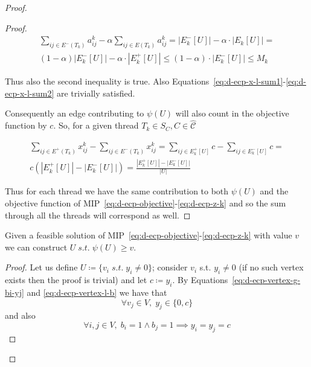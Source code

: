 \begin{proof}
\begin{proof}
		\begin{multline}
			\sum^{}_{ij \in E^{-} (T_k)} a_{ij}^{k}  - \alpha \sum^{}_{ij \in E(T_k)}
			a_{ij} ^{k} = |E^{-}_{k}[U]| - \alpha \cdot |E_{k}[U]| = \\
			(1- \alpha)|E^{-}_{k}[U]| - \alpha \cdot |E^{+}_{k}[U]| \leq
			(1 -\alpha) \cdot |E^{-}_{k}[U]| \leq M_k
		\end{multline}

		Thus also the second inequality is true. Also
		Equations~\ref{eq:d-ecp-x-l-sum1}-\ref{eq:d-ecp-x-l-sum2} are trivially
		satisfied.

		\bigskip
		Consequently an edge contributing to $\psi(U)$ will also count in the
		objective function by $c$. So, for a given thread $T_k \in S_C, C \in \mathcal{\hat{C}}$

		\begin{multline*}
			\sum^{}_{ij \in E^{+} (T_{k})} x_{ij} ^{k} - \sum_{ij \in E^{-}
				(T_{k})} x_{ij} ^{k} = \sum^{}_{ij \in E^{+}_k[U] } c - \sum_{ij \in E^{-}
			_k[U]} c = \\ c (|E^{+}_{k}[U]| - |E^{-}_{k}[U]|) =
			\frac{|E^{+}_{k}[U]| - |E^{-}_{k}[U]|}{|U|}
		\end{multline*}

		Thus for each thread we have the same contribution to both $\psi(U)$
		and the objective function of
		MIP~\ref{eq:d-ecp-objective}-\ref{eq:d-ecp-z-k} and so the sum through
		all the threads will correspond as well.
	\end{proof}

	\begin{claim}
		Given a feasible solution of
		MIP~\ref{eq:d-ecp-objective}-\ref{eq:d-ecp-z-k} with value $v$ we can
		construct $U \; s.t. \; \psi(U) \geq v$.
	\end{claim}

	\begin{proof}

		Let us define $U \coloneqq \{ v_i \; s.t. \; y_i \neq 0\}$; consider
		$v_i$ s.t. $y_i \neq 0$ (if no such vertex exists then the proof is
		trivial) and let $c \coloneqq y_i$. By
		Equations~\ref{eq:d-ecp-vertex-g-bi-yj} and \ref{eq:d-ecp-vertex-l-b}
		we have that
		\begin{equation}
			\label{eq:d-ecpp-y-in}
			\forall v_j \in V, \; y_j \in \{ 0, c\}
		\end{equation}
		and also
		\begin{equation}
			\forall i, j \in V, \; b_i = 1 \land b_j = 1 \implies y_i = y_j = c
		\end{equation}


\end{proof}
\end{proof}
